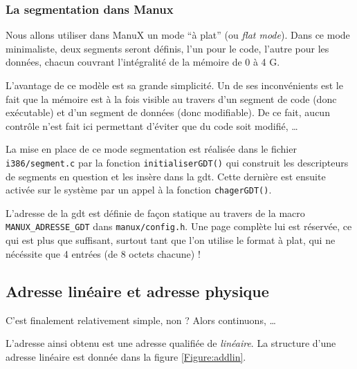 \subsubsection{La segmentation dans Manux}

   Nous allons utiliser dans ManuX un mode ``à plat'' (ou {\em flat
mode}). Dans ce mode minimaliste, deux segments seront définis, l'un
pour le code, l'autre pour les données, chacun couvrant l'intégralité
de la mémoire de 0 à 4 G.

   L'avantage de ce modèle est sa grande simplicité. Un de ses
inconvénients est le fait que la mémoire est à la fois visible au
travers d'un segment de code (donc exécutable) et d'un segment de
données (donc modifiable). De ce fait, aucun contrôle n'est fait ici
permettant d'éviter que du code soit modifié, \ldots

   La mise en place de ce mode segmentation est réalisée dans le
fichier {\tt i386/segment.c} par la fonction \lstinline!initialiserGDT()!
qui construit les descripteurs de segments en question et les insère
dans la {\sc gdt}. Cette dernière est ensuite activée sur le système
par un appel à la fonction \lstinline!chagerGDT()!.

   L'adresse de la {\sc gdt} est définie de façon statique au travers
de la macro \lstinline!MANUX_ADRESSE_GDT! dans {\tt manux/config.h}.
Une page complète lui est réservée, ce qui est plus que suffisant,
surtout tant que l'on utilise le format à plat, qui ne nécéssite que 4
entrées (de 8 octets chacune) !
   
%      
\subsection{Adresse linéaire et adresse physique}

C'est finalement relativement simple, non ? Alors continuons,
   \ldots

   L'adresse ainsi obtenu est une adresse qualifiée de {\em
     linéaire}. La structure d'une adresse linéaire est donnée dans la
   figure \ref{Figure:addlin}.

